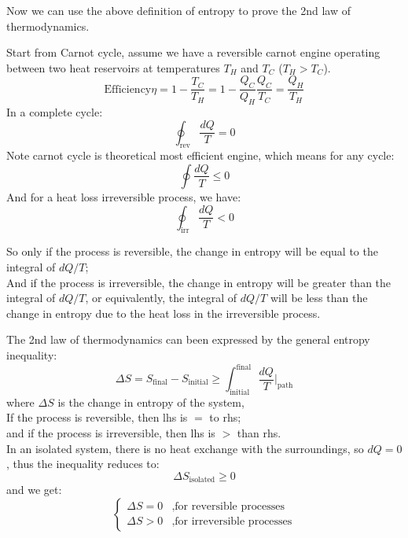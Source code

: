\bigskip\noindent
Now we can use the above definition of entropy to prove the 2nd law of thermodynamics.
\begin{foundation}
    Start from Carnot cycle, assume we have a reversible carnot engine operating between two heat reservoirs at temperatures $T_H$ and $T_C$ ($T_H > T_C$). \\
    \[
        \text{Efficiency} \eta = 1 - \frac{T_C}{T_H} = 1 - \frac{Q_C}{Q_H}
        \frac{Q_C}{T_C} = \frac{Q_H}{T_H}
    \]
    In a complete cycle:
    \[
        \oint_\text{rev} \frac{dQ}{T} = 0
    \]
    Note carnot cycle is theoretical most efficient engine, which means for any cycle:
    \[
        \oint \frac{dQ}{T} \leq 0
    \]
    And for a heat loss irreversible process, we have:
    \[
        \oint_\text{irr} \frac{dQ}{T} < 0
    \]

    So only if the process is reversible, the change in entropy will be equal to the integral of $dQ/T$; \\

    And if the process is irreversible, the change in entropy will be greater than the integral of $dQ/T$, or equivalently, the integral of $dQ/T$ will be less than the change in entropy due to the heat loss in the irreversible process.
\end{foundation}

\clearpage
\begin{theory}
    The 2nd law of thermodynamics can been expressed by the general entropy inequality:
    \[
        \Delta S = S_{\text{final}} - S_{\text{initial}} \geq \int_{\text{initial}}^{\text{final}} \frac{dQ}{T} |_{\text{path}}
    \]
    where $\Delta S$ is the change in entropy of the system, \\
    If the process is reversible, then lhs is $=$ to rhs;\\
    and if the process is irreversible, then lhs is $>$ than rhs. \\

    In an isolated system, there is no heat exchange with the surroundings, so $dQ = 0$, thus the inequality reduces to:
    \[
        \Delta S_{\text{isolated}} \geq 0
    \]
    and we get:
    \[
        \begin{cases}
            \Delta S = 0 & ,\text{for reversible processes} \\
            \Delta S > 0 & ,\text{for irreversible processes}
        \end{cases}
    \]
\end{theory}

